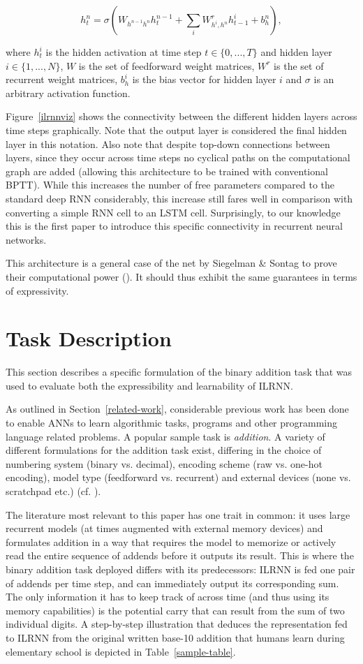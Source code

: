 \documentclass{article}
\begin{document}
\[
h_t^n = \sigma(W_{h^{n-1} h^n} h_t^{n-1} + \sum_i W_{h^i,h^n}^r h_{t-1}^i + b_h^n),
\]

where $h_t^i$ is the hidden activation at time step $t \in \{0, ..., T\}$ and hidden layer $i \in \{1, ..., N\}$, $W$ is the set of feedforward weight matrices, $W^r$ is the set of recurrent weight matrices, $b_h^i$ is the bias vector for hidden layer $i$ and $\sigma$ is an arbitrary activation function.

Figure~\ref{ilrnnviz} shows the connectivity between the different hidden layers across time steps graphically. Note that the output layer is considered the final hidden layer in this notation. Also note that despite top-down connections between layers, since they occur across time steps no cyclical paths on the computational graph are added (allowing this architecture to be trained with conventional BPTT). While this increases the number of free parameters compared to the standard deep RNN considerably, this increase still fares well in comparison with converting a simple RNN cell to an LSTM cell. Surprisingly, to our knowledge this is the first paper to introduce this specific connectivity in recurrent neural networks.

This architecture is a general case of the net by Siegelman & Sontag to prove their computational power (\citeyear{siegelmann1995computational}). It should thus exhibit the same guarantees in terms of expressivity.

\section{Task Description}

This section describes a specific formulation of the binary addition task that was used to evaluate both the expressibility and learnability of ILRNN.

As outlined in Section~\ref{related-work}, considerable previous work has been done to enable ANNs to learn algorithmic tasks, programs and other programming language related problems. A popular sample task is \textit{addition}. A variety of different formulations for the addition task exist, differing in the choice of numbering system (binary vs. decimal), encoding scheme (raw vs. one-hot encoding), model type (feedforward vs. recurrent) and external devices (none vs. scratchpad etc.) (cf. \citealt{npi}).

The literature most relevant to this paper has one trait in common: it uses large recurrent models (at times augmented with external memory devices) and formulates addition in a way that requires the model to memorize or actively read the entire sequence of addends before it outputs its result. This is where the binary addition task deployed differs with its predecessors: ILRNN is fed one pair of addends per time step, and can immediately output its corresponding sum. The only information it has to keep track of across time (and thus using its memory capabilities) is the potential carry that can result from the sum of two individual digits. A step-by-step illustration that deduces the representation fed to ILRNN from the original written base-10 addition that humans learn during elementary school is depicted in Table~\ref{sample-table}.
\end{document}
